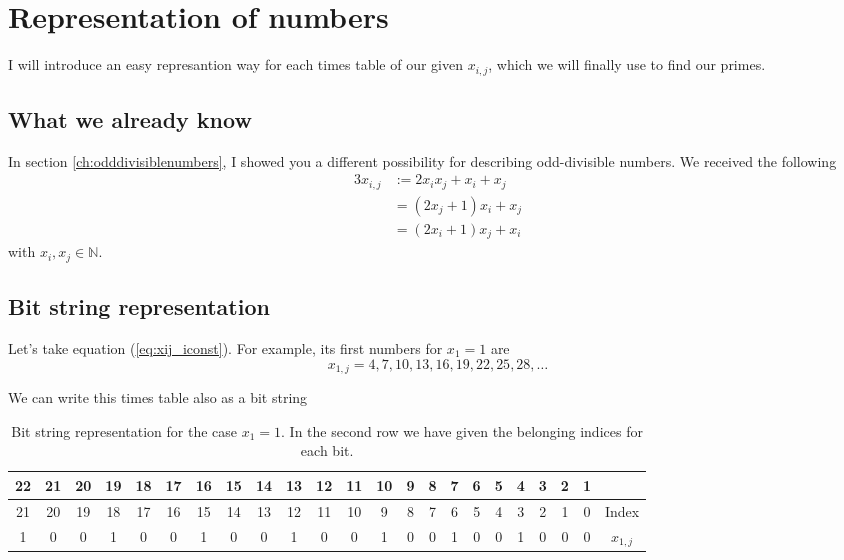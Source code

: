 \chapter{Representation of numbers}
\label{ch:representationofnumbers}
\minitoc
I will introduce an easy represantion way for each times table of our given $x_{i,j}$, which we will finally use to find our primes.
\section{What we already know}
\label{s:whatwealreadyknow}
In section \ref{ch:odddivisiblenumbers}, I showed you a different possibility for describing odd-divisible numbers. We received the following
\begin{alignat}{3}
	x_{i,j} &:= 2x_{i}x_{j} + x_{i} + x_{j} \label{eq:xij_gen} \\
	&= \left(2x_{j} + 1\right)x_{i} + x_{j} \label{eq:xij_jconst} \\
	&= \left(2x_{i} + 1\right)x_{j} + x_{i} \label{eq:xij_iconst}	
\end{alignat}
with $x_{i}, x_{j} \in \mathbb{N}$.
\section{Bit string representation}
\label{s:bitstringrepresantion}
Let's take equation (\ref{eq:xij_iconst}). For example, its first numbers for $x_{1} = 1$ are
\begin{equation}
	x_{1,j} = 4, 7, 10, 13, 16, 19, 22, 25, 28, \dots
\label{eq:xi1_firstnumbers}\end{equation}

We can write this times table also as a bit string

\begin{table}[H]
\centering
\caption{Bit string representation for the case $x_{1} = 1$. In the second row we have given the belonging indices for each bit.}
\tiny
\begin{tabular}{cccccccccccccccccccccc||c}
				\cellcolor{yellow} 22 & 21 & 20 & \cellcolor{yellow} 19 & 18 & 17 & \cellcolor{yellow} 16 & 15 & 14 & \cellcolor{yellow} 13 & 12 & 11 & \cellcolor{yellow} 10 & 9 & 8 & \cellcolor{yellow} 7 & 6 & 5 & \cellcolor{yellow} 4 & 3 & 2 & 1 & \\
\hline				21 & 20 & 19 & 18 & 17 & 16 & 15 & 14 & 13 & 12 & 11 & 10 & 9  & 8 & 7 & 6 & 5 & 4 & 3 & 2 & 1 & 0 & Index \\
\hline\hline \rowcolor{green}	\cellcolor{red} 1 &  0 &  0 &  \cellcolor{red} 1 &  0 &  0 & \cellcolor{red} 1 &  0 &  0 & \cellcolor{red} 1 &  0 &  0 & \cellcolor{red} 1 & 0 & 0 & \cellcolor{red} 1 & 0 & 0 & \cellcolor{red} 1 & 0 & 0 & 0 & $x_{1,j}$
\end{tabular}
\label{tab:bitstringx1_1}
\end{table}

